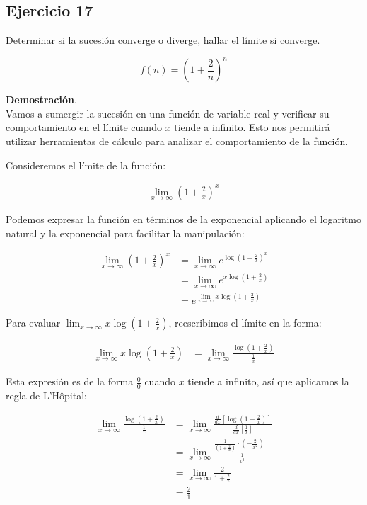 \documentclass{article}
\begin{document}
    \subsection*{Ejercicio 17}

    Determinar si la sucesión converge o diverge, hallar el límite si converge.

    $$
    f(n)=\left(1+\frac{2}{n}\right)^{n}
    $$

    \textbf{Demostración}.\\

    Vamos a sumergir la sucesión en una función de variable real y verificar su comportamiento en el límite cuando \( x \) tiende a infinito. Esto nos permitirá utilizar herramientas de cálculo para analizar el comportamiento de la función.

    Consideremos el límite de la función:

    \begin{align*}
    \lim_{x \rightarrow \infty}\left(1+\frac{2}{x}\right)^{x}
    \end{align*}

    Podemos expresar la función en términos de la exponencial aplicando el logaritmo natural y la exponencial para facilitar la manipulación:

    \begin{align*}
    \lim_{x \rightarrow \infty}\left(1+\frac{2}{x}\right)^{x} &= \lim_{x \rightarrow \infty} e^{\log \left(1+\frac{2}{x}\right)^{x}} \\
    &= \lim_{x \rightarrow \infty} e^{x \log \left(1+\frac{2}{x}\right)} \\
    &= e^{\lim_{x \rightarrow \infty} x \log \left(1+\frac{2}{x}\right)}
    \end{align*}

    Para evaluar \( \lim_{x \rightarrow \infty} x \log \left(1+\frac{2}{x}\right) \), reescribimos el límite en la forma:

    \begin{align*}
    \lim_{x \rightarrow \infty} x \log \left(1+\frac{2}{x}\right) &= \lim_{x \rightarrow \infty} \frac{\log \left(1+\frac{2}{x}\right)}{\frac{1}{x}}
    \end{align*}

    Esta expresión es de la forma \( \frac{0}{0} \) cuando \( x \) tiende a infinito, así que aplicamos la regla de L'Hôpital:

    \begin{align*}
    \lim_{x \rightarrow \infty} \frac{\log \left(1+\frac{2}{x}\right)}{\frac{1}{x}} &= \lim_{x \rightarrow \infty} \frac{\frac{d}{dx} \left[\log \left(1+\frac{2}{x}\right)\right]}{\frac{d}{dx} \left[\frac{1}{x}\right]} \\
    &= \lim_{x \rightarrow \infty} \frac{\frac{1}{\left(1+\frac{2}{x}\right)} \cdot \left(-\frac{2}{x^2}\right)}{-\frac{1}{x^2}} \\
    &= \lim_{x \rightarrow \infty} \frac{2}{1+\frac{2}{x}} \\
    &= \frac{2}{1}
    \end{align*}
\end{document}
